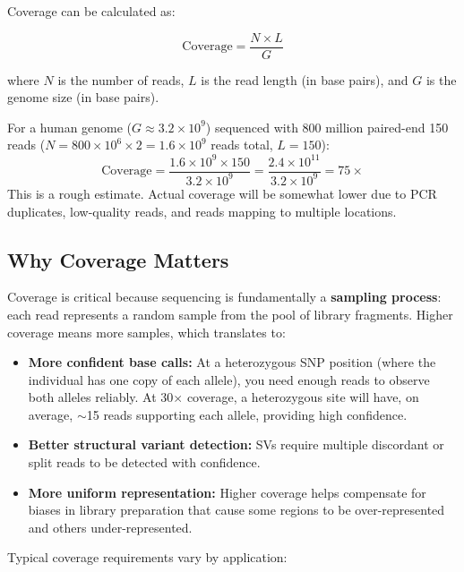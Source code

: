 Coverage can be calculated as:

\begin{equation}
\text{Coverage} = \frac{N \times L}{G}
\label{eq:seqprinciples:coverage}
\end{equation}

where $N$ is the number of reads, $L$ is the read length (in base pairs), and $G$ is the genome size (in base pairs).

\begin{keyconcept}[title={Calculating Coverage}]
For a human genome ($G \approx 3.2 \times 10^9$\basepair{}) sequenced with 800 million paired-end 150\basepair{} reads ($N = 800 \times 10^6 \times 2 = 1.6 \times 10^9$ reads total, $L = 150$\basepair{}):
\[
\text{Coverage} = \frac{1.6 \times 10^9 \times 150}{3.2 \times 10^9} = \frac{2.4 \times 10^{11}}{3.2 \times 10^9} = 75\times
\]
This is a rough estimate. Actual coverage will be somewhat lower due to PCR duplicates, low-quality reads, and reads mapping to multiple locations.
\end{keyconcept}

\subsection{Why Coverage Matters}
\label{subsec:seqprinciples:coverage-importance}

Coverage is critical because sequencing is fundamentally a \textbf{sampling process}: each read represents a random sample from the pool of library fragments. Higher coverage means more samples, which translates to:

\begin{itemize}[itemsep=2pt]
  \item \textbf{More confident base calls:} At a heterozygous SNP position (where the individual has one copy of each allele), you need enough reads to observe both alleles reliably. At 30$\times$ coverage, a heterozygous site will have, on average, $\sim$15 reads supporting each allele, providing high confidence.
  \item \textbf{Better structural variant detection:} SVs require multiple discordant or split reads to be detected with confidence.
  \item \textbf{More uniform representation:} Higher coverage helps compensate for biases in library preparation that cause some regions to be over-represented and others under-represented.
\end{itemize}

Typical coverage requirements vary by application:

